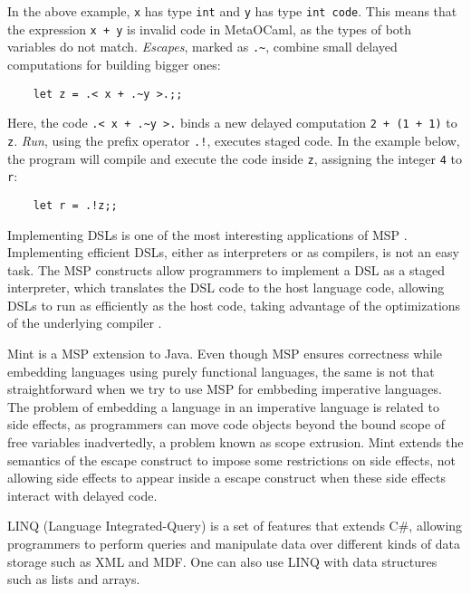 \documentclass[english]{llncs}
\begin{document}
In the above example, \texttt{x} has type \texttt{int} and \texttt{y} has
type \texttt{int code}. 
This means that the expression \texttt{x + y} is invalid code in MetaOCaml,
as the types of both variables do not match. \emph{Escapes}, marked as \texttt{.\~}, combine small delayed computations for building
bigger ones:
\begin{verbatim}
    let z = .< x + .~y >.;;
\end{verbatim}

Here, the code \texttt{.< x + .\~{}y >.} binds a new delayed computation
\texttt{2 + (1 + 1)} to \texttt{z}. \emph{Run}, using the prefix operator \texttt{.!}, executes staged code.
In the example below, the program will compile and execute the code inside
\texttt{z}, assigning the integer \texttt{4} to \texttt{r}:

\begin{verbatim}
    let r = .!z;;
\end{verbatim}

Implementing DSLs is one of the most interesting applications of MSP \cite{Czarnecki2004DSL}.
Implementing efficient DSLs, either as interpreters or as compilers,
is not an easy task.
The MSP constructs allow programmers to implement a DSL as
a staged interpreter, which translates the DSL code to the host language code,
allowing DSLs to run as efficiently as the host code, taking advantage
of the optimizations of the underlying compiler \cite{Taha2004gentle}.

Mint \cite{Westbrook2010Mint} is a MSP extension to Java.
Even though MSP ensures correctness while embedding languages using
purely functional languages, the same is not that straightforward when
we try to use MSP for embbeding imperative languages.
The problem of embedding a language in an imperative language is
related to side effects, as programmers can move code objects
beyond the bound scope of free variables inadvertedly, a problem
known as scope extrusion.
Mint extends the semantics of the escape construct to impose
some restrictions on side effects, not allowing side effects to
appear inside a escape construct when these side effects interact
with delayed code.


LINQ (Language Integrated-Query) \cite{linq} is a set of features that
extends C\#, allowing programmers to perform queries and manipulate data over
different kinds of data storage such as XML and MDF.
One can also use LINQ with data structures such as lists and arrays.
\end{document}
